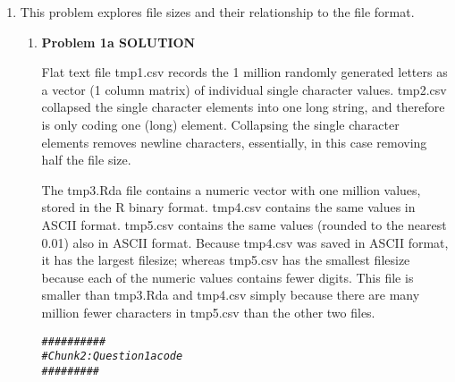 \documentclass{article}\usepackage[]{graphicx}\usepackage[]{color}
\makeatletter
\newcommand{\hlcom}[1]{\textcolor[rgb]{0.678,0.584,0.686}{\textit{#1}}}%
\newenvironment{kframe}{%
 \def\at@end@of@kframe{}%
 \ifinner\ifhmode%
  \def\at@end@of@kframe{\end{minipage}}%
  \begin{minipage}{\columnwidth}%
 \fi\fi%
 \def\FrameCommand##1{\hskip\@totalleftmargin \hskip-\fboxsep
 \colorbox{shadecolor}{##1}\hskip-\fboxsep
     \hskip-\linewidth \hskip-\@totalleftmargin \hskip\columnwidth}%
 \MakeFramed {\advance\hsize-\width
   \@totalleftmargin\z@ \linewidth\hsize
   \@setminipage}}%
 {\par\unskip\endMakeFramed%
 \at@end@of@kframe}
\newenvironment{knitrout}{}{} %
\makeatother
\begin{document}
\begin{enumerate}
\item This problem explores file sizes and their relationship to the file format. %

\begin{enumerate}
\item   \textbf{Problem 1a SOLUTION}  %

Flat text file tmp1.csv records the 1 million randomly generated letters as a vector (1 column matrix) of individual single character values. tmp2.csv collapsed the single character elements into one long string, and therefore is only coding one (long) element. Collapsing the single character elements removes newline characters, essentially, in this case removing half the file size.

The tmp3.Rda file contains a numeric vector with one million values, stored in the R binary format. tmp4.csv  contains the same values in ASCII format. tmp5.csv contains the same values (rounded to the nearest 0.01) also in ASCII format. Because tmp4.csv was saved in ASCII format, it has the largest filesize; whereas tmp5.csv has the smallest filesize because each of the numeric values contains fewer digits. This file is smaller than tmp3.Rda and tmp4.csv simply because there are many million fewer characters in tmp5.csv than the other two files.


\begin{knitrout}
\color{fgcolor}\begin{kframe}
\begin{alltt}
\hlcom{##########}
\hlcom{# Chunk 2: Question 1a code}
\hlcom{#########}


\end{alltt}
\end{kframe}
\end{knitrout}
\end{enumerate}
\end{enumerate}
\end{document}
